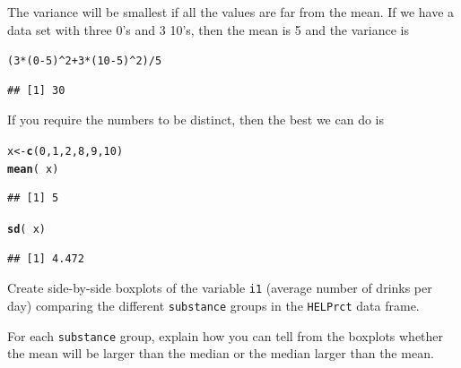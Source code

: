 \documentclass[twoside]{book}\usepackage[]{graphicx}\usepackage[]{xcolor}
\makeatletter
\newcommand{\hlnum}[1]{\textcolor[rgb]{0.686,0.059,0.569}{#1}}%
\newcommand{\hlopt}[1]{\textcolor[rgb]{0,0,0}{#1}}%
\newcommand{\hlstd}[1]{\textcolor[rgb]{0.345,0.345,0.345}{#1}}%
\newcommand{\hlkwb}[1]{\textcolor[rgb]{0.69,0.353,0.396}{#1}}%
\newcommand{\hlkwd}[1]{\textcolor[rgb]{0.737,0.353,0.396}{\textbf{#1}}}%
\newenvironment{kframe}{%
 \def\at@end@of@kframe{}%
 \ifinner\ifhmode%
  \def\at@end@of@kframe{\end{minipage}}%
  \begin{minipage}{\columnwidth}%
 \fi\fi%
 \def\FrameCommand##1{\hskip\@totalleftmargin \hskip-\fboxsep
 \colorbox{shadecolor}{##1}\hskip-\fboxsep
     \hskip-\linewidth \hskip-\@totalleftmargin \hskip\columnwidth}%
 \MakeFramed {\advance\hsize-\width
   \@totalleftmargin\z@ \linewidth\hsize
   \@setminipage}}%
 {\par\unskip\endMakeFramed%
 \at@end@of@kframe}
\newenvironment{knitrout}{}{} %
\newcommand{\variable}[1]{{\color{green!50!black}\texttt{#1}}}
\newcommand{\Rindex}[1]{\index{\texttt{#1}}}
\newcommand{\dataframe}[1]{{\color{blue!80!black}\texttt{#1}}\Rindex{#1}}
\makeatother
\begin{document}
\begin{solution}
	The variance will be smallest if all the values are far from the mean.
	If we have a data set with three 0's and 3 10's, then the mean is 5 and the 
	variance is
\begin{knitrout}
\color{fgcolor}\begin{kframe}
\begin{alltt}
\hlstd{(} \hlnum{3}\hlopt{*}\hlstd{(}\hlnum{0}\hlopt{-}\hlnum{5}\hlstd{)}\hlopt{^}\hlnum{2} \hlopt{+} \hlnum{3}\hlopt{*}\hlstd{(}\hlnum{10}\hlopt{-}\hlnum{5}\hlstd{)}\hlopt{^}\hlnum{2} \hlstd{)} \hlopt{/} \hlnum{5}
\end{alltt}
\begin{verbatim}
## [1] 30
\end{verbatim}
\end{kframe}
\end{knitrout}
	If you require the numbers to be distinct, then the best we can do is
\begin{knitrout}
\color{fgcolor}\begin{kframe}
\begin{alltt}
\hlstd{x} \hlkwb{<-} \hlkwd{c}\hlstd{(}\hlnum{0}\hlstd{,}\hlnum{1}\hlstd{,}\hlnum{2}\hlstd{,}\hlnum{8}\hlstd{,}\hlnum{9}\hlstd{,}\hlnum{10}\hlstd{)}
\hlkwd{mean}\hlstd{(}\hlopt{~}\hlstd{x)}
\end{alltt}
\begin{verbatim}
## [1] 5
\end{verbatim}
\begin{alltt}
\hlkwd{sd}\hlstd{(}\hlopt{~}\hlstd{x)}
\end{alltt}
\begin{verbatim}
## [1] 4.472
\end{verbatim}
\end{kframe}
\end{knitrout}
\end{solution}

\begin{problem}
	Create side-by-side boxplots of the variable \variable{i1} (average number of
	drinks per day) comparing the different \variable{substance} groups
	in the \dataframe{HELPrct} data frame.

	For each \variable{substance} group, explain how you can tell from the 
	boxplots whether the mean will be larger than the median or the median 
	larger than the mean.
\end{problem}
\end{document}

